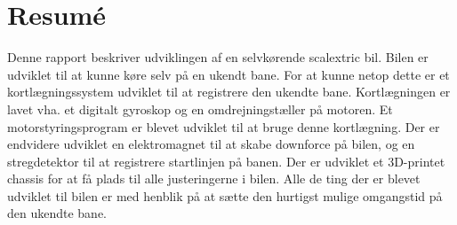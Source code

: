 \section*{Resumé}
Denne rapport beskriver udviklingen af en selvkørende scalextric bil.
Bilen er udviklet til at kunne køre selv på en ukendt bane.
For at kunne netop dette er et kortlægningssystem udviklet til at registrere den ukendte bane.
Kortlægningen er lavet vha. et digitalt gyroskop og en omdrejningstæller på motoren.
Et motorstyringsprogram er blevet udviklet til at bruge denne kortlægning.
Der er endvidere udviklet en elektromagnet til at skabe downforce på bilen, og en stregdetektor til at registrere startlinjen på banen.
Der er udviklet et 3D-printet chassis for at få plads til alle justeringerne i bilen.
Alle de ting der er blevet udviklet til bilen er med henblik på at sætte den hurtigst mulige omgangstid på den ukendte bane.
